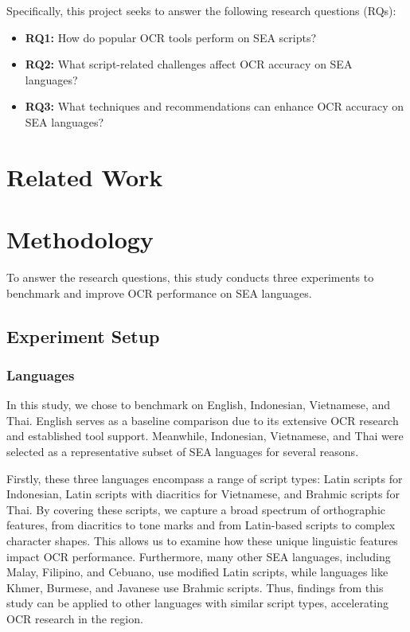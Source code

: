 \documentclass[12pt,oneside]{memoir}
\begin{document}
Specifically, this project seeks to answer the following research questions (RQs):

\begin{itemize}
    \item \textbf{RQ1:} How do popular OCR tools perform on SEA scripts?
    \item \textbf{RQ2:} What script-related challenges affect OCR accuracy on SEA languages?
    \item \textbf{RQ3:} What techniques and recommendations can enhance OCR accuracy on SEA languages?
\end{itemize}

\chapter{Related Work}

\chapter{Methodology}

To answer the research questions, this study conducts three experiments to benchmark and improve OCR performance on SEA languages.

\section{Experiment Setup}

\subsection{Languages}

In this study, we chose to benchmark on English, Indonesian, Vietnamese, and Thai. English serves as a baseline comparison due to its extensive OCR research and established tool support. Meanwhile, Indonesian, Vietnamese, and Thai were selected as a representative subset of SEA languages for several reasons.

Firstly, these three languages encompass a range of script types: Latin scripts for Indonesian, Latin scripts with diacritics for Vietnamese, and Brahmic scripts for Thai. 
By covering these scripts, we capture a broad spectrum of orthographic features, from diacritics to tone marks and from Latin-based scripts to complex character shapes. This allows us to examine how these unique linguistic features impact OCR performance. 
Furthermore, many other SEA languages, including Malay, Filipino, and Cebuano, use modified Latin scripts, while languages like Khmer, Burmese, and Javanese use Brahmic scripts. Thus, findings from this study can be applied to other languages with similar script types, accelerating OCR research in the region.
\end{document}
